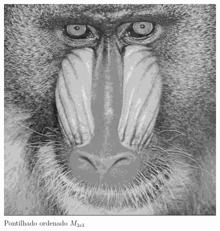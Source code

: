\documentclass{article}
\begin{document}
\begin{figure}[!htb]
\begin{minipage}{0.48\textwidth}
      \includegraphics[width=.99\linewidth]{results/image_1.png}
      \caption{Pontilhado ordenado $ M_{3x3}$}\label{Fig:baboon2}
    \end{minipage}
 \end{figure}
\end{document}
